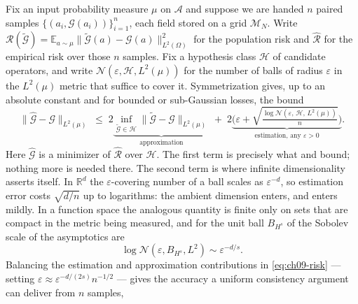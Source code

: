 Fix an input probability measure $\mu$ on $\mathcal{A}$ and suppose we are handed
$n$ paired samples $\{(a_i,\mathcal{G}(a_i))\}_{i=1}^n$, each field stored on a
grid $\mathcal{M}_N$. Write $\mathcal{R}(\tilde{\mathcal{G}}) =
\mathbb{E}_{a\sim\mu}\|\tilde{\mathcal{G}}(a)-\mathcal{G}(a)\|^2_{L^2(\Omega)}$
for the population risk and $\hat{\mathcal{R}}$ for the empirical risk over
those $n$ samples. Fix a hypothesis class $\mathcal{H}$ of candidate operators,
and write $\mathcal{N}(\varepsilon,\mathcal{H},L^{2}(\mu))$ for the number of
balls of radius $\varepsilon$ in the $L^{2}(\mu)$ metric that suffice to cover
it. Symmetrization gives, up to an absolute constant and for
bounded or sub-Gaussian losses, the bound
\begin{equation}
  \|\hat{\mathcal{G}}-\mathcal{G}\|_{L^2(\mu)}
  \;\le\;
  2\underbrace{\inf_{\tilde{\mathcal{G}}\in\mathcal{H}}\|\tilde{\mathcal{G}}-\mathcal{G}\|_{L^2(\mu)}}_{\text{approximation}}
  \;+\;
  2\underbrace{\Big(\varepsilon+\sqrt{\tfrac{\log \mathcal{N}(\varepsilon,\,\mathcal{H},\,L^2(\mu))}{n}}\Big)}_{\text{estimation, any }\varepsilon>0}.
  \label{eq:ch09-risk}
\end{equation}
Here $\hat{\mathcal{G}}$ is a minimizer of $\hat{\mathcal{R}}$ over
$\mathcal{H}$. The first term is precisely what
and  bound; nothing
more is needed there. The second term is where infinite dimensionality asserts
itself. In
$\mathbb{R}^d$ the $\varepsilon$-covering number of a ball scales as
$\varepsilon^{-d}$, so estimation error costs $\sqrt{d/n}$ up to logarithms: the
ambient dimension enters, and enters mildly. In a function space the analogous
quantity is finite only on sets that are compact in the metric being measured,
and for the unit ball $B_{H^s}$ of the Sobolev scale of
the asymptotics are
\begin{equation}
  \log \mathcal{N}(\varepsilon, B_{H^s}, L^2) \sim \varepsilon^{-d/s}.
  \label{eq:ch09-entropy}
\end{equation}
Balancing the estimation and approximation contributions in
\eqref{eq:ch09-risk} --- setting
$\varepsilon \approx \varepsilon^{-d/(2s)}n^{-1/2}$ --- gives the accuracy a
uniform consistency argument can deliver from $n$ samples,
